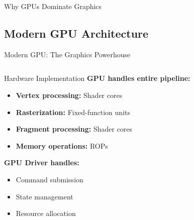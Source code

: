 \begin{frame}{Why GPUs Dominate Graphics}
\end{frame}

\subsection{Modern GPU Architecture}
\begin{frame}{Modern GPU: The Graphics Powerhouse}
  \begin{columns}
    \begin{column}{0.6\textwidth}
      \small
      \begin{conceptbox}{Hardware Implementation}
        \textbf{GPU handles entire pipeline:}
        \begin{itemize}
          \item \textbf{Vertex processing:} Shader cores
          \item \textbf{Rasterization:} Fixed-function units
          \item \textbf{Fragment processing:} Shader cores
          \item \textbf{Memory operations:} ROPs
        \end{itemize}

        \vspace{0.3cm}
        \textbf{GPU Driver handles:}
        \begin{itemize}
          \item Command submission
          \item State management
          \item Resource allocation
        \end{itemize}
      \end{conceptbox}
    \end{column}
    \begin{column}{0.4\textwidth}
\end{column}
\end{columns}
\end{frame}
